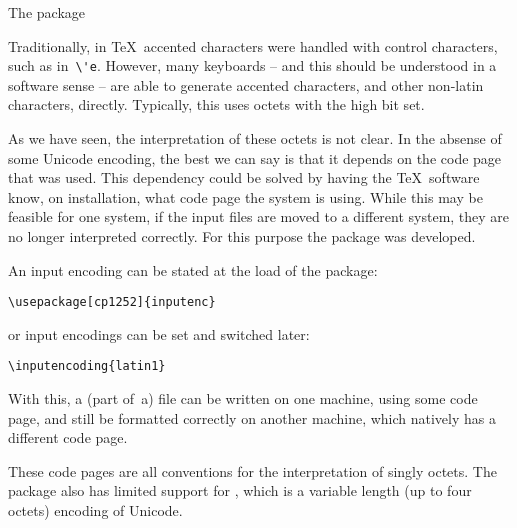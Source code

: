  {The \protect{} package}

Traditionally, in \TeX\ accented characters were handled with control
characters, such as in~\verb+\'e+. However, many keyboards -- and this
should be understood in a software sense -- are able to generate
accented characters, and other non-latin characters,
directly. Typically, this uses octets with the high bit set.

As we have seen, the interpretation of these octets is not clear. In
the absense of some Unicode encoding, the best we can say is that it
depends on the code page that was used. This dependency could be
solved by having the \TeX\ software know, on installation, what code
page the system is using. While this may be feasible for one system,
if the input files are moved to a different system, they are no longer
interpreted correctly. For this purpose the  package was
developed.

An input encoding can be stated at the load of the package:
\begin{verbatim}
\usepackage[cp1252]{inputenc}
\end{verbatim}
or input encodings can be set and switched later:
\begin{verbatim}
\inputencoding{latin1}
\end{verbatim}
With this, a (part of~a) file can be written on one machine, using
some code page, and still be formatted correctly on another machine,
which natively has a different code page.

These code pages are all conventions for the interpretation of singly
octets. The  package also has limited support for
, which is a variable length (up to four octets) encoding of
Unicode.
